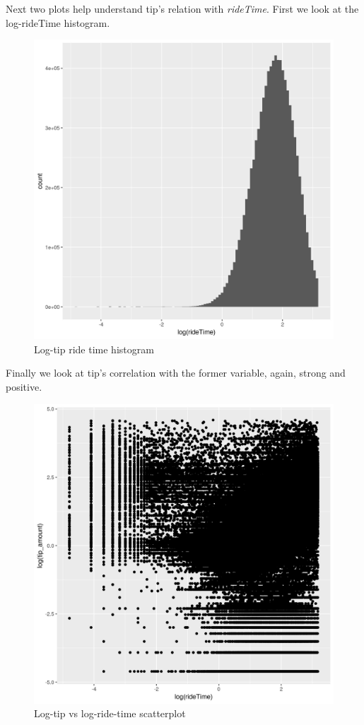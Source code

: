 \documentclass[11pt]{article}
\begin{document}
Next two plots help understand tip's relation with \emph{rideTime}.
First we look at the log-rideTime histogram.
\begin{figure}[htbp]
\centering
\includegraphics[width=.9\linewidth]{./plots/rideTimeHist.jpg}
\caption{\label{fig:org2bec3ee}
Log-tip ride time histogram}
\end{figure}

Finally we look at tip's correlation with the former variable, again,
strong and positive.
\begin{figure}[htbp]
\centering
\includegraphics[width=.9\linewidth]{./plots/rideTipPlot.jpg}
\caption{\label{fig:org3e96d2d}
Log-tip vs log-ride-time scatterplot}
\end{figure}
\end{document}
